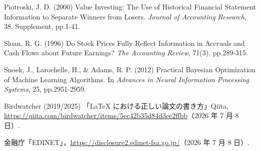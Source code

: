 \documentclass[a4paper,10pt]{article}
\begin{document}
\begin{enumerate}[label={[\,\arabic*\,]},leftmargin=2.6em]
\item Piotroski, J. D. (2000) Value Investing: The Use of Historical Financial Statement Information to Separate Winners from Losers. \textit{Journal of Accounting Research}, 38, Supplement, pp.1-41.
\item Sloan, R. G. (1996) Do Stock Prices Fully Reflect Information in Accruals and Cash Flows about Future Earnings? \textit{The Accounting Review}, 71(3), pp.289-315.
\item Snoek, J., Larochelle, H., \& Adams, R. P. (2012) Practical Bayesian Optimization of Machine Learning Algorithms. In \textit{Advances in Neural Information Processing Systems}, 25, pp.2951-2959.
\item Birdwatcher (2019/2025) 「LaTeX における正しい論文の書き方」Qiita, \url{https://qiita.com/birdwatcher/items/5ec42b35d84d3ee2ffbb}（2026 年 7 月 8 日）.
\item 金融庁「EDINET」，\url{https://disclosure2.edinet-fsa.go.jp/}（2026 年 7 月 8 日）.
\end{enumerate}
\end{document}
